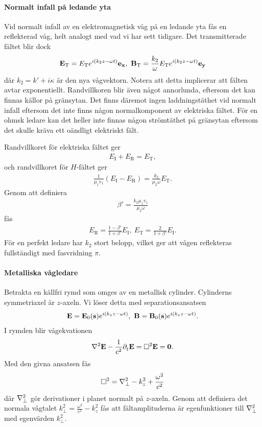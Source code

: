 \paragraph{Normalt infall på ledande yta}
Vid normalt infall av en elektromagnetisk våg på en ledande yta fås en reflekterad våg, helt analogt med vad vi har sett tidigare. Det transmitterade fältet blir dock
\begin{align*}
	\vb{E}_{\text{T}} = E_{\text{T}}e^{i(k_{2}z - \omega t)}\ub{x},\ \vb{B}_{\text{T}} = \frac{k_{2}}{\omega}E_{\text{T}}e^{i(k_{2}z - \omega t)}\ub{y}
\end{align*}
där $k_{2} = k' + i\kappa$ är den nya vågvektorn. Notera att detta implicerar att fälten avtar exponentiellt. Randvillkoren blir även något annorlunda, eftersom det kan finnas källor på gränsytan. Det finns däremot ingen laddningstäthet vid normalt infall eftersom det inte finns någon normalkomponent av elektriska fältet. För en ohmsk ledare kan det heller inte finnas någon strömtäthet på gränsytan eftersom det skulle kräva ett oändligt elektriskt fält.

Randvillkoret för elektriska fältet ger
\begin{align*}
	E_{\text{I}} + E_{\text{R}} = E_{\text{T}},
\end{align*}
och randvillkoret för $H$-fältet ger
\begin{align*}
	\frac{1}{\mu_{1}v_{1}}(E_{\text{I}} - E_{\text{R}}) = \frac{k_{2}}{\mu_{2}\omega}E_{\text{T}}.
\end{align*}
Genom att definiera
\begin{align*}
	\beta' = \frac{k_{2}\mu_{1}v_{1}}{\mu_{2}\omega}
\end{align*}
fås
\begin{align*}
	E_{\text{R}} = \frac{1 - \beta'}{1 + \beta'}E_{\text{I}},\ E_{\text{T}} = \frac{2}{1 + \beta'}E_{\text{I}}.
\end{align*}
För en perfekt ledare har $k_{2}$ stort belopp, vilket ger att vågen reflekteras fullständigt med fasvridning $\pi$.

\paragraph{Metalliska vågledare}
Betrakta en källfri rymd som omges av en metallisk cylinder. Cylinderns symmetriaxel är $z$-axeln. Vi löser detta med separationsansatsen
\begin{align*}
	\vb{E} = \vb{E}_{0}(\vb{s})e^{i(k_{z}z - \omega t)},\ \vb{B} = \vb{B}_{0}(\vb{s})e^{i(k_{z}z - \omega t)}.
\end{align*}
I rymden blir vågekvationen
\begin{align*}
	\laplacian{\vb{E}} - \frac{1}{c^{2}}\del{t}{\vb{E}} = \dalemb{\vb{E}} = \vb{0}.
\end{align*}
Med den givna ansatsen fås
\begin{align*}
	\dalemb = \laplaperp - k_{z}^{2} + \frac{\omega^{2}}{c^{2}}
\end{align*}
där $\laplaperp$ gör derivationer i planet normalt på $z$-axeln. Genom att definiera det normala vågtalet $k_{\perp}^{2} = \frac{\omega^{2}}{c^{2}} - k_{z}^{2}$ fås att fältamplituderna är egenfunktioner till $\laplaperp$ med egenvärden $k_{\perp}^{2}$.

